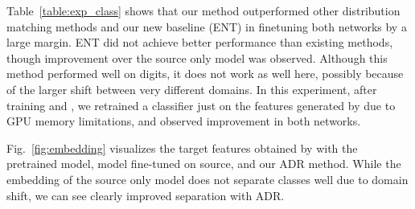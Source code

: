 \documentclass{article} \usepackage{iclr2018_conference,times}
\begin{document}
Table~\ref{table:exp_class} shows that our method outperformed other distribution matching methods and our new baseline (ENT) in finetuning both networks by a large margin. ENT did not achieve better performance than existing methods, though improvement over the source only model was observed. Although this method performed well on digits, it does not work as well here, possibly because of the larger shift between very different domains. 
In this experiment, after training  and , we retrained a classifier  just on the features generated by  due to GPU memory limitations, and observed improvement in both networks. 

Fig.~\ref{fig:embedding} visualizes the target features obtained by  with the pretrained model, model fine-tuned on source, and our ADR method. While the embedding of the source only model does not separate classes well due to domain shift, we can see clearly improved separation with ADR. 
\end{document}
